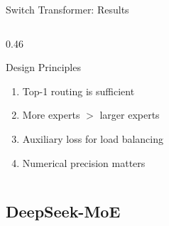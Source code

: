 \begin{frame}{Switch Transformer: Results}
\begin{columns}
\begin{column}{0.46\textwidth}
      \vspace{0.3em}
      \begin{block}{Design Principles}
        \begin{enumerate}
          \item Top-1 routing is sufficient
          \item More experts $>$ larger experts
          \item Auxiliary loss for load balancing
          \item Numerical precision matters
        \end{enumerate}
      \end{block}
    \end{column}
  \end{columns}
\end{frame}

\subsection{DeepSeek-MoE}


